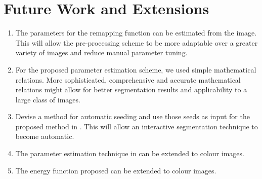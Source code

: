 \section{Future Work and Extensions}

\begin{enumerate}
	\item The parameters for the remapping function can be estimated from the image. This will allow the pre-processing scheme to be more adaptable over a greater variety of images and reduce manual parameter tuning.
	
	\item For the proposed parameter estimation scheme, we used simple mathematical relations. More sophisticated, comprehensive and accurate mathematical relations might allow for better segmentation results and applicability to a large class of images.
	
	\item Devise a method for automatic seeding and use those seeds as input for the proposed method in . This will allow an interactive segmentation technique to become automatic.
	
	\item The parameter estimation technique in  can be extended to colour images.
	
	\item The energy function proposed  can be extended to colour images.
\end{enumerate}

